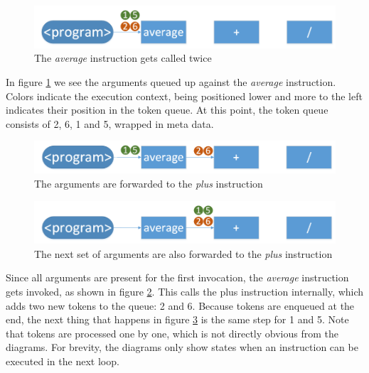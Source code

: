 \begin{figure}[h!]
	\includegraphics[width=\textwidth]{images/Engine-Architecture-1.png}
	\caption{The \textit{average} instruction gets called twice}
	\label{fig:engine-architecture-1}
\end{figure}

In figure \ref{fig:engine-architecture-1} we see the arguments queued up against the \textit{average} instruction. Colors indicate the execution context, being positioned lower and more to the left indicates their position in the token queue. At this point, the token queue consists of 2, 6, 1 and 5, wrapped in meta data. 

\begin{figure}[h!]
	\includegraphics[width=\textwidth]{images/Engine-Architecture-2.png}
	\caption{The arguments are forwarded to the \textit{plus} instruction}
	\label{fig:engine-architecture-2}
\end{figure}

\begin{figure}[h!]
	\includegraphics[width=\textwidth]{images/Engine-Architecture-3.png}
	\caption{The next set of arguments are also forwarded to the \textit{plus} instruction}
	\label{fig:engine-architecture-3}
\end{figure}

Since all arguments are present for the first invocation, the \textit{average} instruction gets invoked, as shown in figure \ref{fig:engine-architecture-2}. This calls the plus instruction internally, which adds two new tokens to the queue: 2 and 6.
Because tokens are enqueued at the end, the next thing that happens in figure \ref{fig:engine-architecture-3} is the same step for 1 and 5. Note that tokens are processed one by one, which is not directly obvious from the diagrams. For brevity, the diagrams only show states when an instruction can be executed in the next loop.

